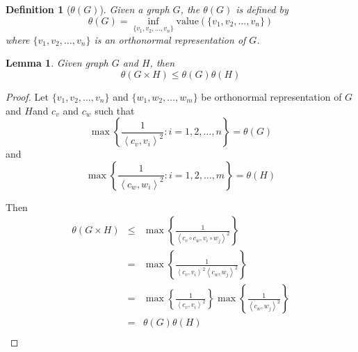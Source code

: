 \documentclass{article}
\newtheorem{definition}{Definition}[section]
\newtheorem{lemma}{Lemma}[section]
\begin{document}
      \begin{definition}[$ \theta(G) $]\label{def:thetaFunction}
            Given a graph $ G $, the $ \theta(G) $ is defined by
            \begin{equation}
                  \theta(G) = \inf_{\{v_1, v_2, \dots, v_n\}} \text{value}(\{v_1, v_2, \dots, v_n\})
            \end{equation}
            where $ \{v_1, v_2, \dots, v_n\} $ is an orthonormal representation of $ G $.
      \end{definition}

      \begin{lemma}
            Given graph $ G $ and $ H $, then
            \begin{equation}
                  \theta(G \times H) \leq \theta(G) \theta(H)
            \end{equation}
      \end{lemma}

      \begin{proof}
            Let $ \{v_1, v_2, \dots, v_n\} $ and $ \{w_1, w_2, \dots, w_m\} $ be orthonormal representation of $ G $ and $ H $and $ c_{v} $ and $ c_{w} $ such that
            \begin{equation}
                  \max \left\{ \frac{1}{\left<c_{v},v_{i}\right>^2} : i=1,2,\dots,n \right\} = \theta(G)
            \end{equation} 
            and 
            \begin{equation}
                  \max \left\{ \frac{1}{\left<c_{w},w_{i}\right>^2} : i=1,2,\dots,m \right\} = \theta(H)
            \end{equation}

            Then
            \begin{eqnarray}
                  \theta(G \times H) &\leq& 
                  \max \left\{ \frac{1}{\left<c_{v} \circ c_{w},v_{i} \circ w_{j}\right>^2} \right\} \\
                  &=& \max \left\{ \frac{1}{\left<c_{v},v_{i}\right>^2 \left<c_{w},w_{j}\right>^2} \right\} \\
                  &=& \max \left\{ \frac{1}{\left<c_{v},v_{i}\right>^2} \right\} \max \left\{ \frac{1}{\left<c_{w},w_{j}\right>^2} \right\} \\
                  &=& \theta(G) \theta(H) \\
            \end{eqnarray}
      \end{proof}
\end{document}
